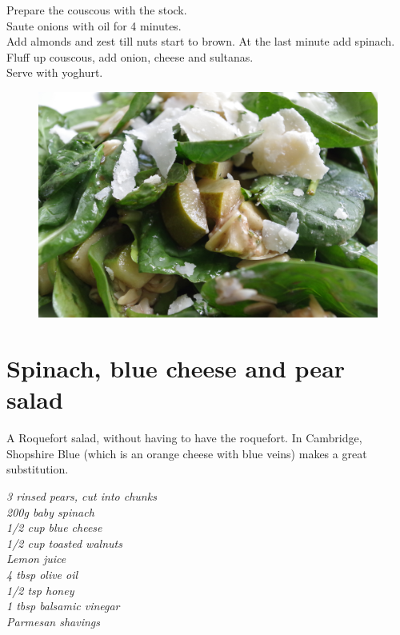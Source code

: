\documentclass{tufte-book}
\begin{document}
\smallskip
Prepare the couscous with the stock.
\\Saute onions with oil for 4 minutes.
\\Add almonds and zest till nuts start to brown. At the last minute add spinach.
\\Fluff up couscous, add onion, cheese and sultanas.
\\Serve with yoghurt.

\newpage

\begin{figure}[h]
  \includegraphics[width=\linewidth]{pearsalad.JPG}
\end{figure}

\section{Spinach, blue cheese and pear salad}

A Roquefort salad, without having to have the roquefort. In Cambridge, Shopshire Blue (which is an orange cheese with blue veins) makes a great substitution.

\smallskip
\emph{3 rinsed pears, cut into chunks
\\200g baby spinach
\\1/2 cup blue cheese
\\1/2 cup toasted walnuts
\\Lemon juice
\\4 tbsp olive oil
\\1/2 tsp honey
\\1 tbsp balsamic vinegar
\\Parmesan shavings
}
\end{document}
